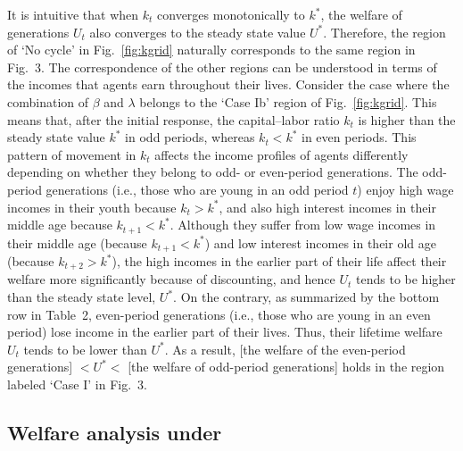 \documentclass[nogrid]{MBE}%
\begin{document}
{It is intuitive that when $k_{t}$ converges monotonically to $k^{\ast}$, the welfare of
generations $U_{t}$ also converges to the steady state value $U^{\ast}$. Therefore, the region of
`No cycle' in Fig.\ \ref{fig:kgrid} naturally corresponds to the same region in Fig.~3. The
correspondence of the other regions can be understood in terms of the incomes that agents earn
throughout their lives. Consider the case where the combination of $\beta$ and $\lambda$ belongs
to the `Case Ib' region of Fig.\ \ref{fig:kgrid}. This means that, after the initial response, the
capital--labor ratio $k_{t}$ is higher than the steady state value $k^{\ast}$ in odd periods,
whereas $k_{t}<k^{\ast}$ in even periods. This pattern of movement in $k_{t}$ affects the income
profiles of agents differently depending on whether they belong to odd- or even-period
generations. The odd-period generations (i.e., those who are young in an odd period $t$) enjoy
high wage incomes in their youth because $k_{t}>k^{\ast}$, and also high interest incomes in their
middle age because $k_{t+1}<k^{\ast}$. Although they suffer from low wage incomes in their middle
age (because $k_{t+1}<k^{\ast}$) and low interest incomes in their old age (because
$k_{t+2}>k^{\ast}$), the high incomes in the earlier part of their life affect their welfare more
significantly because of discounting, and hence $U_{t}$ tends to be higher than the steady state
level, $U^{\ast}$. On the contrary, as summarized by the bottom row in Table~2, even-period
generations (i.e., those who are young in an even period) lose income in the earlier part of their
lives. Thus, their lifetime welfare $U_{t}$ tends to be lower than $U^{\ast}$. As a result, [the
welfare of the even-period generations] $<U^{\ast}<$ [the welfare of odd-period generations] holds
in the region labeled `Case I' in Fig.~3.

\subsection{Welfare analysis under \label{subsec:numerical_u}%
}


}
\end{document}
